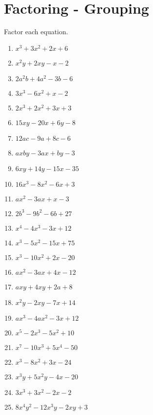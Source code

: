 \section{Factoring - Grouping}
Factor each equation. \\
\begin{enumerate}
\item $x^{3} + 3x^{2} + 2x + 6$
\item $x^{2}y + 2xy - x - 2$
\item $2a^{2}b + 4a^{2} - 3b - 6$
\item $3x^{3} - 6x^{2} + x - 2$
\item $2x^{3} + 2x^{2} + 3x + 3$
\item $15xy - 20x + 6y - 8$
\item $12ac - 9a + 8c - 6$
\item $axby - 3ax + by - 3$
\item $6xy + 14y - 15x - 35$
\item $16x^{3} - 8x^{2} - 6x + 3$
\item $ax^{2} - 3ax + x - 3$
\item $2b^{3} - 9b^{2} - 6b + 27$
\item $x^{4} - 4x^{3} - 3x + 12$
\item $x^{3} - 5x^{2} - 15x + 75$
\item $x^{3} - 10x^{2} + 2x - 20$
\item $ax^{2} - 3ax + 4x - 12$
\item $axy + 4xy + 2a + 8$
\item $x^{2}y - 2xy - 7x + 14$
\item $ax^{3} - 4ax^{2} - 3x + 12$
\item $x^{5} - 2x^{3} - 5x^{2} + 10$
\item $x^{7} - 10x^{3} + 5x^{4} - 50$
\item $x^{3} - 8x^{2} + 3x - 24$
\item $x^{3}y + 5x^{2}y - 4x - 20$
\item $3x^{3} + 3x^{2} - 2x - 2$
\item $8x^{4}y^{2} - 12x^{3}y - 2xy + 3$
\end{enumerate}
